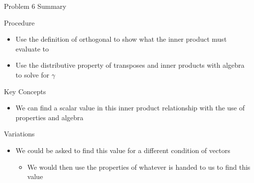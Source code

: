 \begin{summary}{Problem 6 Summary}
    \begin{statement}{Procedure}
        \begin{itemize}
            \item Use the definition of orthogonal to show what the inner product must evaluate to
            \item Use the distributive property of transposes and inner products with algebra to solve for $\gamma$
        \end{itemize}
    \end{statement}
    \begin{statement}{Key Concepts}
        \begin{itemize}
            \item We can find a scalar value in this inner product relationship with the use of properties and algebra
        \end{itemize}
    \end{statement}
    \begin{statement}{Variations}
        \begin{itemize}
            \item We could be asked to find this value for a different condition of vectors
            \begin{itemize}
                \item We would then use the properties of whatever is handed to us to find this value
            \end{itemize}
        \end{itemize}
    \end{statement}
\end{summary}

